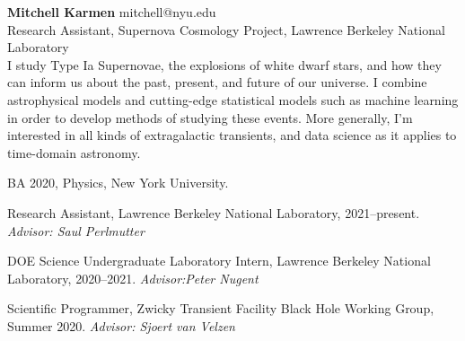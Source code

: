 \documentclass[12pt,letterpaper]{article}
\begin{document}
\thispagestyle{empty}\sloppy\sloppypar\raggedbottom

\textbf{\Large Mitchell Karmen} \hfill
\textsf{\small mitchell@nyu.edu} \\[0.5ex] %
Research Assistant, Supernova Cosmology Project, Lawrence Berkeley National Laboratory\\[0.5ex]
\medskip
I study Type Ia Supernovae, the explosions of white dwarf stars, and how they can inform us about the past, present, and future of our universe.  I combine astrophysical models and cutting-edge statistical models such as machine learning in order to develop methods of studying these events.  More generally, I'm interested in all kinds of extragalactic transients, and data science as it applies to time-domain astronomy.

\begin{list}{}{\cvlist}
  \item
        BA 2020, Physics, New York University.
\end{list}

\begin{list}{}{\cvlist}
  \item
        Research Assistant, Lawrence Berkeley National Laboratory, 2021--present. \textit{Advisor: Saul Perlmutter}
  \item
        DOE Science Undergraduate Laboratory Intern, Lawrence Berkeley National Laboratory, 2020--2021. \textit{Advisor:Peter Nugent}
  \item
        Scientific Programmer, Zwicky Transient Facility Black Hole Working Group, Summer 2020. \textit{Advisor: Sjoert van Velzen}
\end{list}
\end{document}
